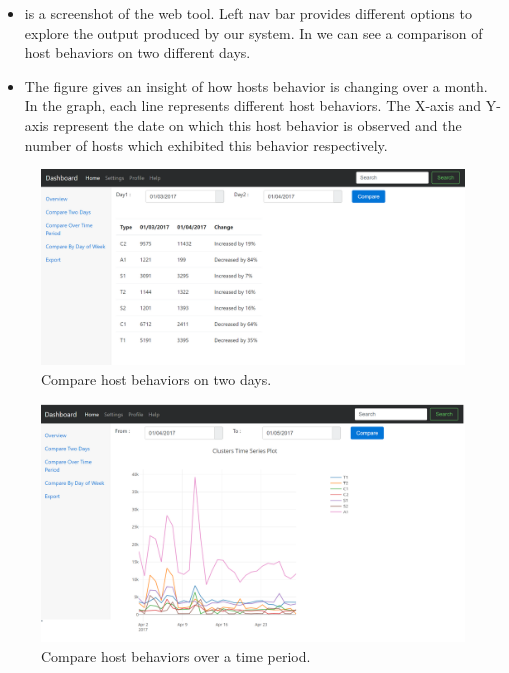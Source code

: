  \begin{itemize}
 	\item {} is a screenshot of the web tool. Left nav bar provides different options to explore the output produced by our system. In  we can see a comparison of host behaviors on two different days.%
 	
 	\item The figure  gives an insight of how hosts behavior is changing over a month.
 	In the graph, each line represents different host behaviors. The X-axis and Y-axis
 	represent the date on which this host behavior is observed and the number of hosts
 	which exhibited this behavior respectively.
 	
 \end{itemize}
 
 
\begin{figure}[t]
	\centerline{\includegraphics[scale = 0.45]{tool_compare_days.png}}
	\caption{Compare host behaviors on two days.}%
\end{figure} 


\begin{figure}[b]
	\centerline{\includegraphics[scale = 0.45]{tool_compare_week.png}}
	\caption{Compare host behaviors over a time period.}%
\end{figure}